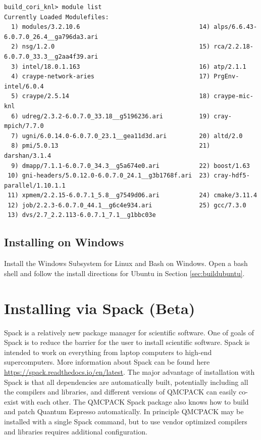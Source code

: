 \verbatimfont{\footnotesize}
\begin{verbatim}
build_cori_knl> module list
Currently Loaded Modulefiles:
  1) modules/3.2.10.6                                 14) alps/6.6.43-6.0.7.0_26.4__ga796da3.ari
  2) nsg/1.2.0                                        15) rca/2.2.18-6.0.7.0_33.3__g2aa4f39.ari
  3) intel/18.0.1.163                                 16) atp/2.1.1
  4) craype-network-aries                             17) PrgEnv-intel/6.0.4
  5) craype/2.5.14                                    18) craype-mic-knl
  6) udreg/2.3.2-6.0.7.0_33.18__g5196236.ari          19) cray-mpich/7.7.0
  7) ugni/6.0.14.0-6.0.7.0_23.1__gea11d3d.ari         20) altd/2.0
  8) pmi/5.0.13                                       21) darshan/3.1.4
  9) dmapp/7.1.1-6.0.7.0_34.3__g5a674e0.ari           22) boost/1.63
 10) gni-headers/5.0.12.0-6.0.7.0_24.1__g3b1768f.ari  23) cray-hdf5-parallel/1.10.1.1
 11) xpmem/2.2.15-6.0.7.1_5.8__g7549d06.ari           24) cmake/3.11.4
 12) job/2.2.3-6.0.7.0_44.1__g6c4e934.ari             25) gcc/7.3.0
 13) dvs/2.7_2.2.113-6.0.7.1_7.1__g1bbc03e

\end{verbatim}

\subsection{Installing on Windows}
Install the Windows Subsystem for Linux and Bash on Windows.
Open a bash shell and follow the install directions for Ubuntu in Section \ref{sec:buildubuntu}.

\section{Installing via Spack (Beta)}
Spack is a relatively new package manager for scientific software.
One of goals of Spack is to reduce the barrier for the user to install scientific
software. Spack is intended to work on everything from laptop
computers to high-end supercomputers. More information about Spack can
be found here \url{https://spack.readthedocs.io/en/latest}. The major
advantage of installation with Spack is that all dependencies are
automatically built, potentially including all the compilers and libraries, and
different versions of QMCPACK can easily co-exist with each other.
The QMCPACK Spack package also knows how to build
and patch Quantum Espresso automatically. In principle QMCPACK may be installed with
a single Spack command, but to use vendor optimized compilers and libraries requires
additional configuration.

